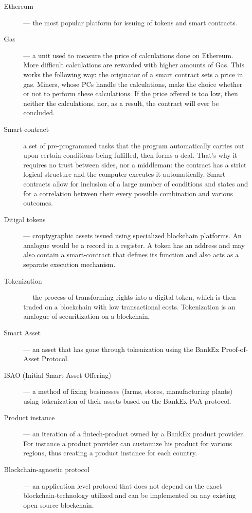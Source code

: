 \documentclass{article}
\begin{document}
\begin{description}
\item[Ethereum]--- the most popular platform for issuing of tokens and smart contracts. 
\item[Gas]--- a unit used to measure the price of calculations done on Ethereum. More difficult calculations are rewarded with higher amounts of Gas. This works the following way: the originator of a smart contract sets a price in gas. Miners, whose PCs handle the calculations, make the choice whether or not to perform these calculations. If the price offered is too low, then neither the calculations, nor, as a result, the contract will ever be concluded. 
\item[Smart-contract] a set of pre-programmed tasks that the program automatically carries out upon certain conditions being fulfilled, then forms a deal. That’s why it requires no trust between sides, nor a middleman: the contract has a strict logical structure and the computer executes it automatically. Smart-contracts allow for inclusion of a large number of conditions and states and for a correlation between their every possible combination and various outcomes. 
\item[Ditigal tokens]--- croptygraphic assets issued using specialized blockchain platforms. An analogue would be a record in a register. A token has an address and may also contain a smart-contract that defines its function and also acts as a separate execution mechanism. 
\item[Tokenization]--- the process of transforming rights into a digital token, which is then traded on a blockchain with low transactional costs. Tokenization is an analogue of securitization on a blockchain. 
\item[Smart Asset]--- an asset that has gone through tokenization using the BankEx Proof-of-Asset Protocol. 
\item[ISAO (Initial Smart Asset Offering)]--- a method of fixing businesses (farms, stores, manufacturing plants) using tokenization of their assets based on the BankEx PoA protocol. 
\item[Product instance]--- an iteration of a fintech-product owned by a BankEx product provider. For instance a product provider can customize his product for various regions, thus creating a product instance for each country. 
\item[Blockchain-agnostic protocol]--- an application level protocol that does not depend on the exact blockchain-technology utilized and can be implemented on any existing open source blockchain. 
\end{description}
\end{document}
